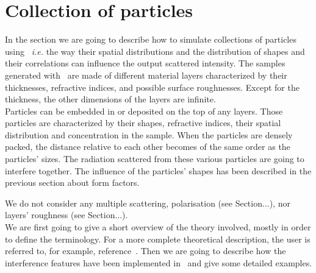 

\chapter{Collection of particles} \label{appendixinterf} 

In the section we are going to describe how to simulate collections of particles using \BornAgain\ \textit{i.e.} the way their spatial distributions and the distribution of shapes and their correlations can influence the output scattered intensity. The samples generated with \BornAgain\ are made of different material layers characterized by their thicknesses, refractive indices, and possible surface roughnesses. Except for the thickness, the other dimensions of the layers are infinite.\\ Particles can be embedded in or deposited on the top of any layers. Those particles are characterized by their shapes, refractive indices, their spatial distribution and concentration in the sample. When the particles are densely packed, the distance relative to each other becomes of the same order as the particles' sizes. The radiation scattered from these various particles are going to interfere together. The influence of the particles' shapes has been described in the previous section about form factors.

We do not consider any multiple scattering, polarisation (see Section...), nor layers' roughness (see Section...).\\ We are first going to give a short overview of the theory involved, mostly in order to define the terminology. For a more complete theoretical description, the user is referred to, for example, reference~\cite{ReLa09}. Then we are going to describe how the interference features have been implemented in \BornAgain\ and give some detailed examples.



